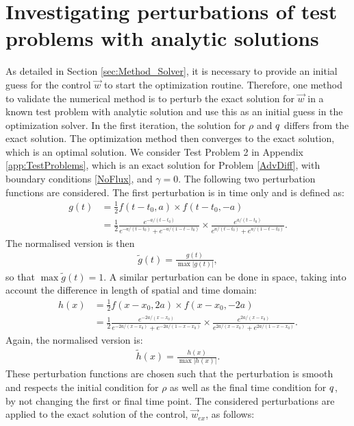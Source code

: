 

\section{Investigating perturbations of test problems with analytic solutions} \label{app:TestProblemsPerturbed}

As detailed in Section \ref{sec:Method_Solver}, it is necessary to provide an initial guess for the control $\vec{w}$ to start the optimization routine. Therefore, one method to validate the numerical method is to perturb the exact solution for $\vec{w}$ in a known test problem with analytic solution and use this as an initial guess in the optimization solver. In the first iteration, the solution for $\rho$ and $q$ differs from the exact solution. The optimization method then converges to the exact solution, which is an optimal solution. We consider Test Problem 2 in Appendix \ref{app:TestProblems}, which is an exact solution for Problem \eqref{AdvDiff}, with boundary conditions \eqref{NoFlux}, and $\gamma = 0$. 
The following two perturbation functions are considered. The first perturbation is in time only and is defined as:
\begin{align*}
g(t) &= \frac{1}{2} f(t-t_0, a) \times f(t-t_0, -a)\\
&= \frac{1}{2} \frac{e^{-a/(t-t_0)}}{e^{-a/(t-t_0)} + e^{-a/(1-t -t_0)}} \times \frac{e^{a/(t-t_0)}}{e^{a/(t-t_0)} + e^{a/(1-t - t_0)}}.
\end{align*}
The normalised version is then 
\begin{align*}
\tilde g(t) = \frac{g(t)}{\max{|{g(t)}|}},
\end{align*}
so that $\max{\tilde g(t)} =1$.
A similar perturbation can be done in space, taking into account the difference in length of spatial and time domain:
\begin{align*}
h(x) &= \frac{1}{2} f(x-x_0, 2a) \times f(x-x_0, -2a)\\
&= \frac{1}{2} \frac{e^{-2a/(x-x_0)}}{e^{-2a/(x-x_0)} + e^{-2a/(1-x-x_0)}} \times \frac{e^{2a/(x-x_0)}}{e^{2a/(x-x_0)} + e^{2a/(1-x-x_0)}}.
\end{align*}
Again, the normalised version is:
\begin{align*}
\tilde h(x) = \frac{h(x)}{\max{|{h(x)}|}}.
\end{align*}
These perturbation functions are chosen such that the perturbation is smooth and respects the initial condition for $\rho$ as well as the final time condition for $q$, by not changing the first or final time point. The considered perturbations are applied to the exact solution of the control, $\vec{w}_{ex}$, as follows:
